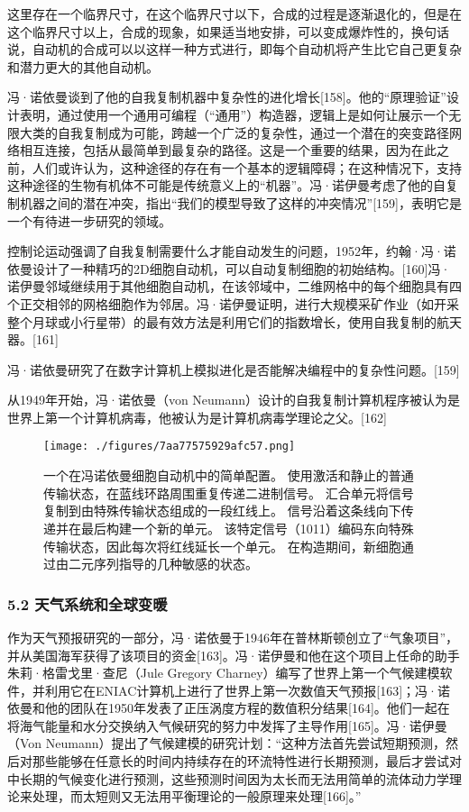 这里存在一个临界尺寸，在这个临界尺寸以下，合成的过程是逐渐退化的，但是在这个临界尺寸以上，合成的现象，如果适当地安排，可以变成爆炸性的，换句话说，自动机的合成可以以这样一种方式进行，即每个自动机将产生比它自己更复杂和潜力更大的其他自动机。

冯·诺依曼谈到了他的自我复制机器中复杂性的进化增长[158]。他的“原理验证”设计表明，通过使用一个通用可编程（“通用”）构造器，逻辑上是如何让展示一个无限大类的自我复制成为可能，跨越一个广泛的复杂性，通过一个潜在的突变路径网络相互连接，包括从最简单到最复杂的路径。这是一个重要的结果，因为在此之前，人们或许认为，这种途径的存在有一个基本的逻辑障碍；在这种情况下，支持这种途径的生物有机体不可能是传统意义上的“机器”。冯·诺伊曼考虑了他的自复制机器之间的潜在冲突，指出“我们的模型导致了这样的冲突情况”[159]，表明它是一个有待进一步研究的领域。

控制论运动强调了自我复制需要什么才能自动发生的问题，1952年，约翰·冯·诺依曼设计了一种精巧的2D细胞自动机，可以自动复制细胞的初始结构。[160]冯·诺伊曼邻域继续用于其他细胞自动机，在该邻域中，二维网格中的每个细胞具有四个正交相邻的网格细胞作为邻居。冯·诺伊曼证明，进行大规模采矿作业（如开采整个月球或小行星带）的最有效方法是利用它们的指数增长，使用自我复制的航天器。[161]

冯·诺依曼研究了在数字计算机上模拟进化是否能解决编程中的复杂性问题。[159]

从1949年开始，冯·诺依曼（von Neumann）设计的自我复制计算机程序被认为是世界上第一个计算机病毒，他被认为是计算机病毒学理论之父。[162]
\begin{figure}[ht]
\centering
\texttt{[image: ./figures/7aa77575929afc57.png]}
\caption{一个在冯诺依曼细胞自动机中的简单配置。 使用激活和静止的普通传输状态，在蓝线环路周围重复传递二进制信号。 汇合单元将信号复制到由特殊传输状态组成的一段红线上。 信号沿着这条线向下传递并在最后构建一个新的单元。 该特定信号（1011）编码东向特殊传输状态，因此每次将红线延长一个单元。 在构造期间，新细胞通过由二元序列指导的几种敏感的状态。} \label{fig_von_10}
\end{figure}
\subsubsection{5.2 天气系统和全球变暖}
作为天气预报研究的一部分，冯·诺依曼于1946年在普林斯顿创立了“气象项目”，并从美国海军获得了该项目的资金[163]。冯·诺伊曼和他在这个项目上任命的助手朱莉·格雷戈里·查尼（Jule Gregory Charney）编写了世界上第一个气候建模软件，并利用它在ENIAC计算机上进行了世界上第一次数值天气预报[163]；冯·诺依曼和他的团队在1950年发表了正压涡度方程的数值积分结果[164]。他们一起在将海气能量和水分交换纳入气候研究的努力中发挥了主导作用[165]。冯·诺伊曼（Von Neumann）提出了气候建模的研究计划：“这种方法首先尝试短期预测，然后对那些能够在任意长的时间内持续存在的环流特性进行长期预测，最后才尝试对中长期的气候变化进行预测，这些预测时间因为太长而无法用简单的流体动力学理论来处理，而太短则又无法用平衡理论的一般原理来处理[166]。”

